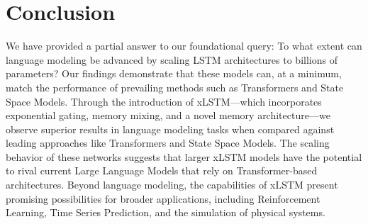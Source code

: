 \section{Conclusion}
We have provided a partial answer to our foundational query: To what extent can language modeling be advanced by scaling LSTM architectures to billions of parameters? Our findings demonstrate that these models can, at a minimum, match the performance of prevailing methods such as Transformers and State Space Models. Through the introduction of xLSTM—which incorporates exponential gating, memory mixing, and a novel memory architecture—we observe superior results in language modeling tasks when compared against leading approaches like Transformers and State Space Models. The scaling behavior of these networks suggests that larger xLSTM models have the potential to rival current Large Language Models that rely on Transformer-based architectures. Beyond language modeling, the capabilities of xLSTM present promising possibilities for broader applications, including Reinforcement Learning, Time Series Prediction, and the simulation of physical systems.

